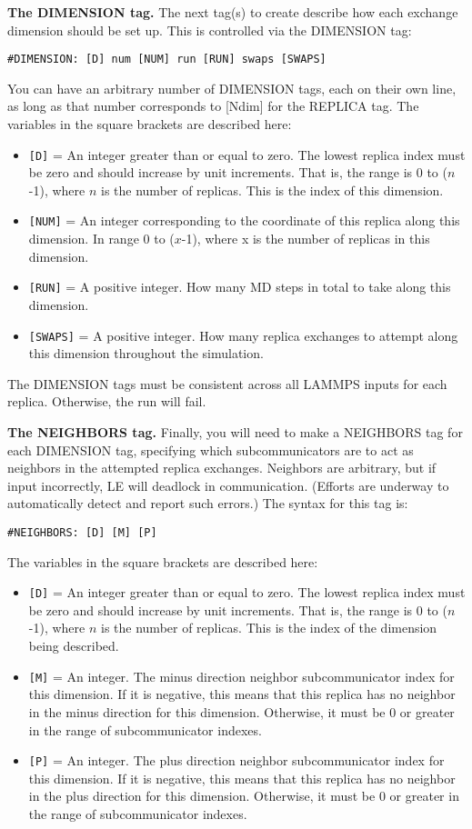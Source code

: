 \documentclass[10pt]{article}
\begin{document}
\textbf{The DIMENSION tag.}
The next tag(s) to create describe how each exchange dimension should be set up. This
is controlled via the DIMENSION tag:
\begin{verbatim}
#DIMENSION: [D] num [NUM] run [RUN] swaps [SWAPS]
\end{verbatim}
You can have an arbitrary number of DIMENSION tags, each on their own line, as
long as that number corresponds to [Ndim] for the REPLICA tag. 
The variables in the square brackets are described here:
\begin{itemize}
\item	\texttt{[D]} = An integer greater than or equal to zero. The lowest
		replica index must be zero and should increase by unit increments. That is,
		the range is 0 to ($n$-1), where $n$ is the number of replicas. This is
		the index of this dimension.
\item	\texttt{[NUM]} = An integer corresponding to the coordinate of this replica
		along this dimension. In range 0 to ($x$-1), where x is the number of replicas
		in this dimension.
\item	\texttt{[RUN]} = A positive integer. How many MD steps in total to take along
		this dimension.
\item	\texttt{[SWAPS]} = A positive integer. How many replica exchanges to attempt along this
		dimension throughout the simulation.
\end{itemize}

The DIMENSION tags must be consistent across all LAMMPS inputs for each replica. Otherwise,
the run will fail.

\textbf{The NEIGHBORS tag.}
Finally, you will need to make a NEIGHBORS tag for each DIMENSION tag, specifying which
subcommunicators are to act as neighbors in the attempted replica exchanges. Neighbors
are arbitrary, but if input incorrectly, LE will deadlock in communication. (Efforts
are underway to automatically detect and report such errors.) The syntax for this
tag is:
\begin{verbatim}
#NEIGHBORS: [D] [M] [P]
\end{verbatim}
The variables in the square brackets are described here:
\begin{itemize}
\item	\texttt{[D]} = An integer greater than or equal to zero. The lowest
		replica index must be zero and should increase by unit increments. That is,
		the range is 0 to ($n$-1), where $n$ is the number of replicas. This is
		the index of the dimension being described.
\item   \texttt{[M]} = An integer. The minus direction neighbor subcommunicator
		index for this dimension. If it is negative, this means that this 
		replica has no neighbor in the minus direction for this dimension. Otherwise,
		it must be 0 or greater in the range of subcommunicator indexes.
\item   \texttt{[P]} = An integer. The plus direction neighbor subcommunicator
		index for this dimension. If it is negative, this means that this 
		replica has no neighbor in the plus direction for this dimension. Otherwise,
		it must be 0 or greater in the range of subcommunicator indexes.
\end{itemize}
\end{document}

